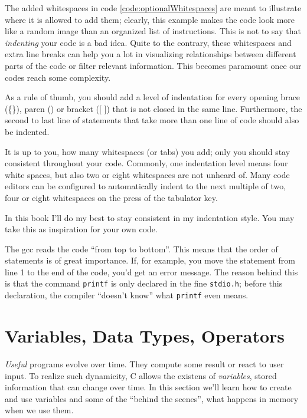 \begin{hintbox}
The added whitespaces in code \ref{code:optionalWhitespaces} are meant to illustrate where it is allowed to add them; clearly, this example makes the code look more like a random image than an organized list of instructions. This is not to say that \emph{indenting} your code is a bad idea. Quite to the contrary, these whitespaces and extra line breaks can help you a lot in visualizing relationships between different parts of the code or filter relevant information. This becomes paramount once our codes reach some complexity.

As a rule of thumb, you should add a level of indentation for every opening brace (\{\}), paren () or bracket ([ ]) that is not closed in the same line. Furthermore, the second to last line of statements that take more than one line of code should also be indented.

It is up to you, how many whitespaces (or tabs) you add; only you should stay consistent throughout your code. Commonly, one indentation level means four white spaces, but also two or eight whitespaces are not unheard of. Many code editors can be configured to automatically indent to the next multiple of two, four or eight whitespaces on the press of the tabulator key.

In this book I'll do my best to stay consistent in my indentation style. You may take this as inspiration for your own code.
\end{hintbox}

The gcc reads the code \enquote{from top to bottom}. This means that the order of statements is of great importance. If, for example, you move the  statement from line 1 to the end of the code, you'd get an error message. The reason behind this is that the command \texttt{printf} is only declared in the fine \texttt{stdio.h}; before this declaration, the compiler \enquote{doesn't know} what \texttt{printf} even means.

\section{Variables, Data Types, Operators} \label{sec:expressions}
\emph{Useful} programs evolve over time. They compute some result or react to user input. To realize such dynamicity, C allows the existens of \emph{variables}, \ie stored information that can change over time. In this section we'll learn how to create and use variables and some of the \enquote{behind the scenes}, \ie what happens in memory when we use them.

